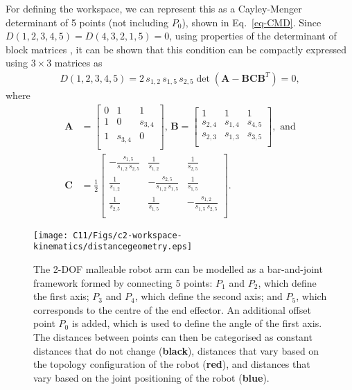 For defining the workspace, we can represent this as a Cayley-Menger determinant of 5 points (not including $P_0$), shown in Eq.~\ref{eq-CMD}. Since $D(1,2,3,4,5) = D(4,3,2,1,5) = 0$, using properties of the determinant of block matrices \cite{Powell}, it can be shown that this condition can be compactly expressed using $3\times3$ matrices as
\begin{align}
    D(1,2,3,4,5) = 2\,s_{1,2}\,s_{1,5}\,s_{2,5}\det(\mathbf{A}-\mathbf{B}\mathbf{C}\mathbf{B}^T)=0, \label{eq:determinant2}
\end{align}
where
\begin{align*}
    \mathbf{A} &= \left[ \begin{array}{ccc}
                0   &   1         & 1       \\
                1   &   0         & s_{3,4} \\
                1   &   s_{3,4}   & 0       \\
                \end{array} \right],\, 
    \mathbf{B} = \left[ \begin{array}{ccc}
                1   &   1         & 1       \\
                s_{2,4}   &   s_{1,4}         & s_{4,5} \\
                 s_{2,3}   &   s_{1,3}         & s_{3,5} \\
                \end{array} \right], \textrm{ and} \\           
    \mathbf{C} &= \frac{1}{2}\left[ \begin{array}{ccc}
                -\frac{s_{1,5}}{s_{1,2}\,s_{2,5}}   &  \frac{1}{s_{1,2}}         &    \frac{1}{s_{2,5}}    \\
                \frac{1}{s_{1,2}}   &   -\frac{s_{2,5}}{s_{1,2}\,s_{1,5}}         & \frac{1}{s_{1,5}} \\
                 \frac{1}{s_{2,5}}   &   \frac{1}{s_{1,5}}         & -\frac{s_{1,2}}{s_{1,5}\,s_{2,5}} \\
                \end{array} \right].
\end{align*}

\begin{figure}[t!]
    \centering
    \texttt{[image: C11/Figs/c2-workspace-kinematics/distancegeometry.eps]}
    \caption{The 2-DOF malleable robot arm can be modelled as a bar-and-joint framework formed by connecting 5 points: $P_1$ and $P_2$, which define the first axis; $P_3$ and $P_4$, which define the second axis; and $P_5$, which corresponds to the centre of the end effector. An additional offset point $P_0$ is added, which is used to define the angle of the first axis. The distances between points can then be categorised as constant distances that do not change (\textbf{black}), distances that vary based on the topology configuration of the robot (\textbf{red}), and distances that vary based on the joint positioning of the robot (\textbf{blue}).}
    \label{distancegeometry}
\end{figure}


